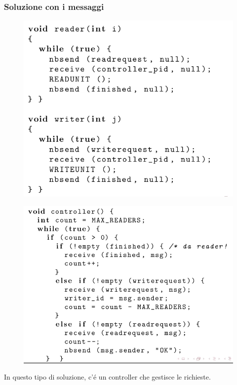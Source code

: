\subsubsection*{Soluzione con i messaggi}
\begin{figure}[H]
    \centering
    \includegraphics[width=0.7\linewidth]{immagini/ScrittoriLettoriConIMessaggi}
\end{figure}
\begin{figure}[H]
    \centering
    \includegraphics[width=0.7\linewidth]{immagini/ScrittoriLettoriMessaggiController}
\end{figure}

 In questo tipo di soluzione, c'é un controller che gestisce le richieste.























































